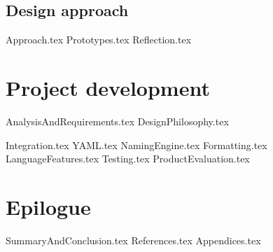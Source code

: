 \documentclass{article} %
\begin{document}
\subsection{Design approach}
{Approach.tex}
{Prototypes.tex}
{Reflection.tex}

\newpage
\section{Project development}
{AnalysisAndRequirements.tex}
{DesignPhilosophy.tex}

{Integration.tex}
{YAML.tex}
{NamingEngine.tex}
{Formatting.tex}
{LanguageFeatures.tex}
{Testing.tex}
{ProductEvaluation.tex}

\newpage
\section{Epilogue}
{SummaryAndConclusion.tex}
{References.tex}
{Appendices.tex}
\end{document}
